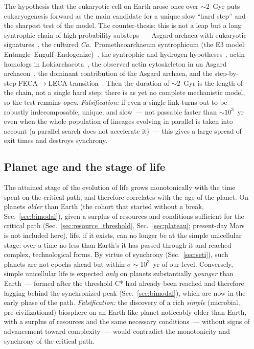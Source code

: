 \documentclass[11pt,a4paper]{article}
\begin{document}
The hypothesis that the eukaryotic cell on Earth arose once over $\sim 2$~Gyr puts eukaryogenesis forward as the main candidate for a unique slow ``hard step'' and the sharpest test of the model. The counter-thesis: this is not a leap but a long syntrophic chain of high-probability substeps~--- Asgard archaea with eukaryotic signatures~\cite{Spang2015,Zaremba2017}, the cultured \emph{Ca.}~Prometheoarchaeum syntrophicum (the E3 model: Entangle--Engulf--Endogenize)~\cite{Imachi2020}, the syntrophic and hydrogen hypotheses~\cite{LopezGarcia2020,Martin1998}, actin homologs in Lokiarchaeota~\cite{Spang2015}, the observed actin cytoskeleton in an Asgard archaeon~\cite{Rodrigues2023}, the dominant contribution of the Asgard archaea, and the step-by-step FECA$\to$LECA transition~\cite{Tobiasson2026,Speijer2025,BravoArevalo2025}. Then the duration of $\sim 2$~Gyr is the length of the chain, not a single hard step; there is as yet no complete mechanistic model, so the test remains \emph{open}. \emph{Falsification:} if even a single link turns out to be robustly indecomposable, unique, and slow~--- not passable faster than $\sim 10^3$~yr even when the whole population of lineages evolving in parallel is taken into account (a parallel search does not accelerate it)~--- this gives a large spread of exit times and destroys synchrony.

\subsection{Planet age and the stage of life}
\label{sec:pred_planet_age}

The attained stage of the evolution of life grows monotonically with the time spent on the critical path, and therefore correlates with the age of the planet. On planets \emph{older} than Earth (the cohort that started without a break, Sec.~\ref{sec:bimodal}), given a surplus of resources and conditions sufficient for the critical path (Sec.~\ref{sec:resource_threshold}, Sec.~\ref{sec:plateau}; present-day Mars is not included here), life, if it exists, can no longer be at the simple unicellular stage: over a time no less than Earth's it has passed through it and reached complex, technological forms. By virtue of synchrony (Sec.~\ref{sec:seti}), such planets are not epochs ahead but within $\sigma \sim 10^3$~yr of our level. Conversely, simple unicellular life is expected \emph{only} on planets substantially \emph{younger} than Earth~--- formed after the threshold C* had already been reached and therefore lagging behind the synchronized peak (Sec.~\ref{sec:bimodal}), which are now in the early phase of the path. \emph{Falsification:} the discovery of a rich \emph{simple} (microbial, pre-civilizational) biosphere on an Earth-like planet noticeably older than Earth, with a surplus of resources and the same necessary conditions~--- without signs of advancement toward complexity~--- would contradict the monotonicity and synchrony of the critical path.
\end{document}
